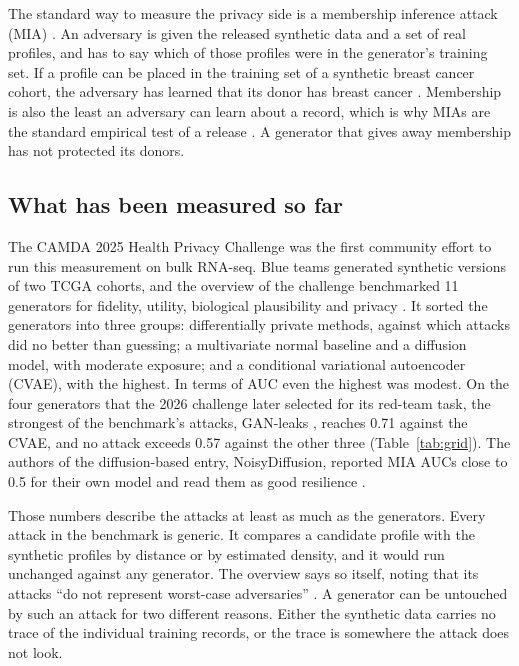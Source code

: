 \documentclass[webpdf,contemporary,large]{oup-authoring-template}
\begin{document}
The standard way to measure the privacy side is a membership inference attack (MIA) \citep{shokri_membership_2017}. An adversary is given the released synthetic data and a set of real profiles, and has to say which of those profiles were in the generator's training set. If a profile can be placed in the training set of a synthetic breast cancer cohort, the adversary has learned that its donor has breast cancer \citep{zhang_membership_2022}. Membership is also the least an adversary can learn about a record, which is why MIAs are the standard empirical test of a release \citep{carlini2022membership}. A generator that gives away membership has not protected its donors.

\subsection{What has been measured so far}

The CAMDA 2025 Health Privacy Challenge was the first community effort to run this measurement on bulk RNA-seq. Blue teams generated synthetic versions of two TCGA cohorts, and the overview of the challenge benchmarked 11 generators for fidelity, utility, biological plausibility and privacy \citep{ozturk2026towards}. It sorted the generators into three groups: differentially private methods, against which attacks did no better than guessing; a multivariate normal baseline and a diffusion model, with moderate exposure; and a conditional variational autoencoder (CVAE), with the highest. In terms of AUC even the highest was modest. On the four generators that the 2026 challenge later selected for its red-team task, the strongest of the benchmark's attacks, GAN-leaks \citep{chen2020gan}, reaches 0.71 against the CVAE, and no attack exceeds 0.57 against the other three (Table~\ref{tab:grid}). The authors of the diffusion-based entry, NoisyDiffusion, reported MIA AUCs close to 0.5 for their own model and read them as good resilience \citep{kreuer2025noisydiffusion}.

Those numbers describe the attacks at least as much as the generators. Every attack in the benchmark is generic. It compares a candidate profile with the synthetic profiles by distance or by estimated density, and it would run unchanged against any generator. The overview says so itself, noting that its attacks ``do not represent worst-case adversaries'' \citep{ozturk2026towards}. A generator can be untouched by such an attack for two different reasons. Either the synthetic data carries no trace of the individual training records, or the trace is somewhere the attack does not look.
\end{document}
